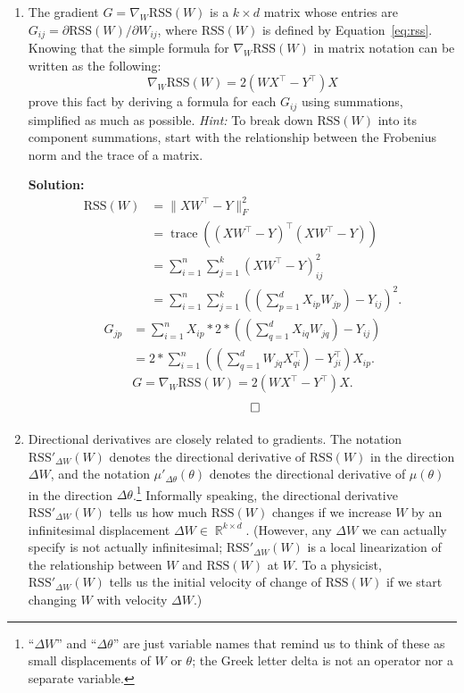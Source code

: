 \documentclass{article}
\DeclareMathOperator{\trac}{\mathrm{trace}}
\DeclareMathOperator{\R}{\mathbb{R}}
\newenvironment{solution}{\color{blue} \smallskip \textbf{Solution:}}{}
\begin{document}
\begin{enumerate}

    \item
    The gradient $G = \nabla_W \mathrm{RSS}(W)$ is a $k \times d$ matrix whose entries are $G_{ij} = \partial \mathrm{RSS}(W) / \partial W_{ij}$, where $\mathrm{RSS}(W)$ is defined by Equation~\eqref{eq:rss}.
    Knowing that the simple formula for $\nabla_W \mathrm{RSS}(W)$ in matrix notation can be written as the following:
    \[
        \nabla_W \mathrm{RSS}(W) = 2 (WX^\top - Y^\top) X
    \]
    prove this fact by deriving a formula for each $G_{ij}$ using summations, simplified as much as possible.
    \emph{Hint:} To break down $\mathrm{RSS}(W)$ into its component summations, start with the relationship between the Frobenius norm and the trace of a matrix.

    \begin{solution}
        \begin{align*}
        \mathrm{RSS}(W) &= \| X W^\top - Y \|^2_F \\
        &= \trac((X W^\top - Y)^\top (X W^\top - Y)) \\
        &= \sum_{i=1}^n\sum_{j=1}^k (X W^\top - Y)_{ij}^2 \\
        &= \sum_{i=1}^n\sum_{j=1}^k ((\sum_{p=1}^d X_{ip} W_{jp}) - Y_{ij})^2.
        \end{align*}
        \begin{align*}
        G_{jp} &= \sum_{i=1}^n X_{ip}*2*((\sum_{q=1}^d X_{iq} W_{jq}) - Y_{ij}) \\
        &= 2*\sum_{i=1}^n((\sum_{q=1}^d W_{jq} X^\top_{qi}) - Y^\top_{ji}) X_{ip}.
        \end{align*}
        $$
        G = \nabla_W \mathrm{RSS}(W) = 2 (WX^\top - Y^\top) X.
        $$
        \[ \qedhere \]
    \end{solution}

    \item
    Directional derivatives are closely related to gradients.
    The notation $\mathrm{RSS}'_{\Delta W}(W)$ denotes the directional derivative of $\mathrm{RSS}(W)$ in the direction $\Delta W$, and the notation $\mu'_{\Delta \theta}(\theta)$ denotes the directional derivative of $\mu(\theta)$ in the direction $\Delta \theta$.\footnote{``$\Delta W$'' and ``$\Delta \theta$'' are just variable names that remind us to think of these as small displacements of $W$ or $\theta$; the Greek letter delta is not an operator nor a separate variable.}
    Informally speaking, the directional derivative $\mathrm{RSS}'_{\Delta W}(W)$ tells us how much $\mathrm{RSS}(W)$ changes if we increase $W$ by an infinitesimal displacement $\Delta W \in \R^{k \times d}$.
    (However, any $\Delta W$ we can actually specify is not actually infinitesimal; $\mathrm{RSS}'_{\Delta W}(W)$ is a local linearization of the relationship between $W$ and $\mathrm{RSS}(W)$ at $W$.
    To a physicist, $\mathrm{RSS}'_{\Delta W}(W)$ tells us the initial velocity of change of $\mathrm{RSS}(W)$ if we start changing $W$ with velocity $\Delta W$.)


\end{enumerate}
\end{document}
